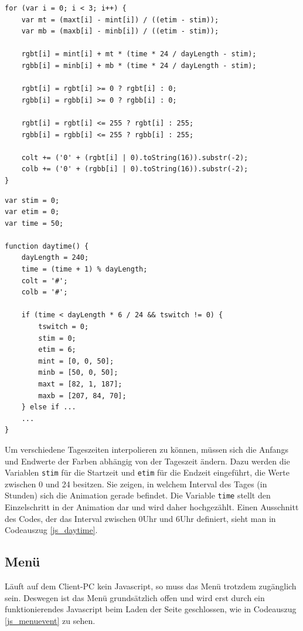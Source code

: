 \begin{lstlisting}[caption=Jede Komponente des Farbvektors wird einzeln interpoliert., label=js_interpol]
for (var i = 0; i < 3; i++) {
	var mt = (maxt[i] - mint[i]) / ((etim - stim));
	var mb = (maxb[i] - minb[i]) / ((etim - stim));
            
	rgbt[i] = mint[i] + mt * (time * 24 / dayLength - stim);
	rgbb[i] = minb[i] + mb * (time * 24 / dayLength - stim);

	rgbt[i] = rgbt[i] >= 0 ? rgbt[i] : 0;
	rgbb[i] = rgbb[i] >= 0 ? rgbb[i] : 0;

	rgbt[i] = rgbt[i] <= 255 ? rgbt[i] : 255;
	rgbb[i] = rgbb[i] <= 255 ? rgbb[i] : 255;

	colt += ('0' + (rgbt[i] | 0).toString(16)).substr(-2);
	colb += ('0' + (rgbb[i] | 0).toString(16)).substr(-2);         
}
\end{lstlisting} 

 \begin{lstlisting}[caption=Die Funktion daytime wird in jedem Animationsframe einmal aufgerufen., label=js_daytime]
var stim = 0;
var etim = 0;
var time = 50;
       
function daytime() {
	dayLength = 240;
	time = (time + 1) % dayLength;
	colt = '#';
	colb = '#';

	if (time < dayLength * 6 / 24 && tswitch != 0) {
		tswitch = 0;
		stim = 0;
		etim = 6;
		mint = [0, 0, 50];
		minb = [50, 0, 50];
		maxt = [82, 1, 187];
		maxb = [207, 84, 70];
	} else if ...
	...
}
\end{lstlisting} 

Um verschiedene Tageszeiten interpolieren zu können, müssen sich die Anfangs und Endwerte der Farben abhängig von der Tageszeit ändern. Dazu werden die Variablen \lstinline{stim} für die Startzeit und \lstinline{etim} für die Endzeit eingeführt, die Werte zwischen 0 und 24 besitzen. Sie zeigen, in welchem Interval des Tages (in Stunden) sich die Animation gerade befindet. Die Variable \lstinline{time} stellt den Einzelschritt in der Animation dar und wird daher hochgezählt. Einen Ausschnitt des Codes, der das Interval zwischen 0Uhr und 6Uhr definiert, sieht man in Codeauszug \ref{js_daytime}.

\subsection{Menü}
Läuft auf dem Client-PC kein Javascript, so muss das Menü trotzdem zugänglich sein. Deswegen ist das Menü grundsätzlich offen und wird erst durch ein funktionierendes Javascript beim Laden der Seite geschlossen, wie in Codeauszug \ref{js_menuevent} zu sehen.

